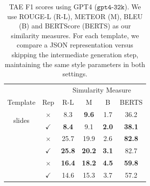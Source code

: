 \begin{table}[]
\small
\centering
\begin{tabular}{cc|cccc}
 &  & \multicolumn{4}{c}{Simularity Measure} \\
Template & Rep & R-L & M & B & BERTS \\ \hline
\multirow{2}{*}{slides} & $\times$ & 8.3 & \textbf{9.6} & 1.7 & 36.2 \\
 & $\checkmark$ & \textbf{8.4} & 9.1 & \textbf{2.0} & \textbf{38.1} \\
 \hdashline[0.5pt/3pt]
\multirow{2}{*}{blog} & $\times$ & 25.7 & 19.9 & 2.6 & \textbf{82.8} \\
 & $\checkmark$ & \textbf{25.8} & \textbf{20.2} & \textbf{3.1} & 82.7 \\
  \hdashline[0.5pt/3pt]
\multirow{2}{*}{poster} & $\times$ & \textbf{16.4} & \textbf{18.2} & \textbf{4.5} & \textbf{59.8} \\
 & $\checkmark$ & 14.6 & 15.3 & 3.7 & 57.2
\end{tabular}
\caption{\small TAE F1 scores using GPT4 ($\texttt{gpt4-32k}$). We use ROUGE-L (R-L), METEOR (M), BLEU (B) and BERTScore (BERTS) as our similarity measures. For each template, we compare a JSON representation versus skipping the intermediate generation step, maintaining the same style parameters in both settings.
}
\label{tbl:gpt4-results}
\end{table}